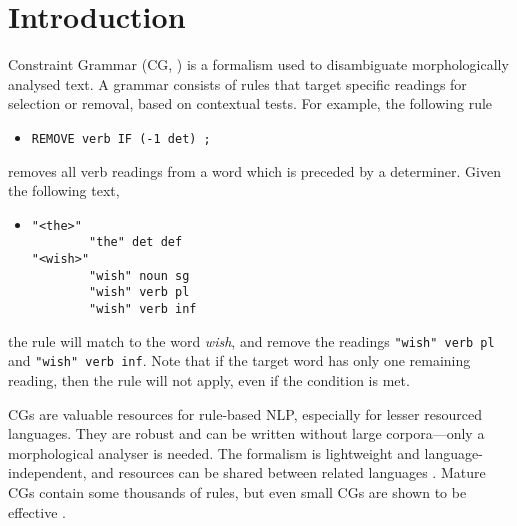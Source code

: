 \section{Introduction}
\label{sec:intro}



Constraint Grammar (CG, )
is a formalism used to disambiguate morphologically analysed text. 
A grammar consists of rules that target specific readings for selection or removal, based on contextual tests. For example, the following rule
\begin{itemize}
\item[] \texttt{REMOVE verb IF (-1 det) ;}
\end{itemize}
removes all verb readings from a word which is preceded by a determiner.
Given the following text,
\begin{itemize}
\item[] 
\begin{verbatim}
"<the>"
        "the" det def
"<wish>"
        "wish" noun sg
        "wish" verb pl
        "wish" verb inf
\end{verbatim}
\end{itemize}
the rule will match to the word \emph{wish}, and remove the readings
\texttt{"wish" verb pl} and \texttt{"wish" verb inf}.
Note that if the target word has only one remaining reading, then the
rule will not apply, even if the condition is met.

CGs are valuable resources for rule-based NLP, especially for lesser
resourced languages. They are robust and can be written without large
corpora---only a morphological analyser is needed. The formalism is
lightweight and language-independent, and resources can be shared
between related languages \cite{bick2006spanish,lene_trond_linda2010}.
Mature CGs contain some thousands of rules, but even small CGs are
shown to be effective \cite{lene_trond2011}.


